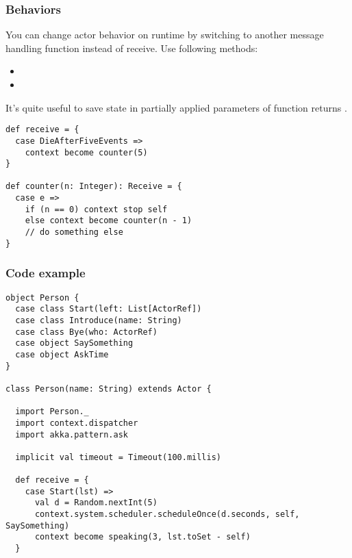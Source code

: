 \begin{frame}[fragile]
\frametitle{Behaviors}
You can change actor behavior on runtime by switching to another message handling function instead
of receive. Use following  methods:
\begin{itemize}
\item {}
\item {}
\end{itemize}

It's quite useful to save state in partially applied parameters of function returns .
\begin{example}
\begin{lstlisting}
def receive = {
  case DieAfterFiveEvents =>
    context become counter(5)
}

def counter(n: Integer): Receive = {
  case e =>
    if (n == 0) context stop self
    else context become counter(n - 1)
    // do something else
}
\end{lstlisting}
\end{example}
\end{frame}

\begin{frame}[fragile]
\frametitle{Code example}
\begin{lstlisting}[name=person]
object Person {
  case class Start(left: List[ActorRef])
  case class Introduce(name: String)
  case class Bye(who: ActorRef)
  case object SaySomething
  case object AskTime
}

class Person(name: String) extends Actor {

  import Person._
  import context.dispatcher
  import akka.pattern.ask

  implicit val timeout = Timeout(100.millis)

  def receive = {
    case Start(lst) =>
      val d = Random.nextInt(5)
      context.system.scheduler.scheduleOnce(d.seconds, self, SaySomething)
      context become speaking(3, lst.toSet - self)
  }
\end{lstlisting}
\end{frame}


